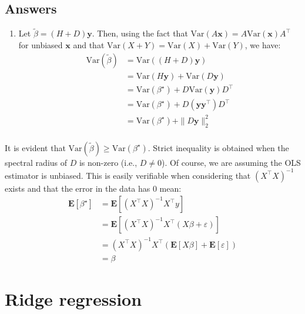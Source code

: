 \documentclass{article}
\begin{document}
    \subsection*{Answers}
    \begin{enumerate}
        \item Let $\tilde{\beta} = (H + D) \mathbf{y}$. Then, using the fact that $\mathrm{Var}(A\mathbf{x}) = A \mathrm{Var}(\mathbf{x}) A^\top$ for unbiased $\mathbf{x}$ and that $\mathrm{Var}(X + Y) = \mathrm{Var}(X) + \mathrm{Var}(Y)$, we have:
            \begin{align*}
                \mathrm{Var}(\tilde{\beta}) &= \mathrm{Var}((H + D) \mathbf{y}) \\
                &= \mathrm{Var}(H \mathbf{y}) + \mathrm{Var}(D \mathbf{y}) \\
                &= \mathrm{Var}(\beta^\star) + D \mathrm{Var}(\mathbf{y}) D^\top \\
                &= \mathrm{Var}(\beta^\star) + D (\mathbf{y} \mathbf{y}^\top) D^\top \\
                &= \mathrm{Var}(\beta^\star) + \| D \mathbf{y} \|_2^2 \\
            \end{align*}
    \end{enumerate}
    It is evident that $\mathrm{Var}(\tilde{\beta}) \geq \mathrm{Var}(\beta^\star)$. Strict inequality is obtained when the spectral radius of $D$ is non-zero (i.e., $D \neq 0$).
    Of course, we are assuming the OLS estimator is unbiased. This is easily verifiable when considering that ${(X^\top X)}^{-1}$ exists and that the error in the data has 0 mean:
    \begin{align*}
        \mathbf{E}[\beta^\star] &= \mathbf{E}[{(X^\top X)}^{-1} X^\top y] \\
        &= \mathbf{E}[{(X^\top X)}^{-1} X^\top (X \beta + \varepsilon)] \\
        &= {(X^\top X)}^{-1} X^\top (\mathbf{E}[X \beta] + \mathbf{E}[\varepsilon]) \\
        &= \beta
    \end{align*}

    \section*{Ridge regression}
\end{document}

